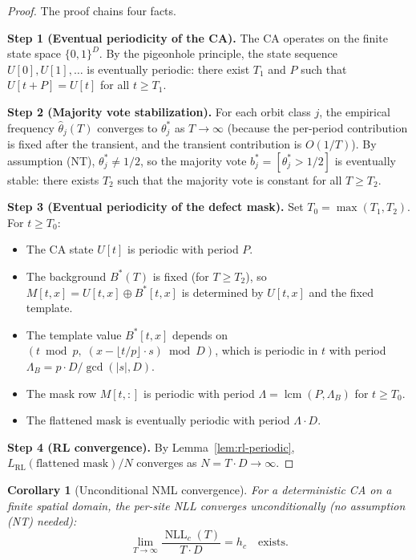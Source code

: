 \documentclass[11pt]{article}
\newtheorem{corollary}[theorem]{Corollary}
\theoremstyle{definition}
\theoremstyle{remark}
\newcommand{\NLL}{\operatorname{NLL}}
\newcommand{\RL}{\operatorname{RL}}
\begin{document}
\begin{proof}
The proof chains four facts.

\medskip\noindent
\textbf{Step 1 (Eventual periodicity of the CA).}
The CA operates on the finite state space $\{0,1\}^D$.
By the pigeonhole principle, the state sequence $U[0], U[1], \ldots$ is eventually periodic: there exist $T_1$ and $P$ such that $U[t + P] = U[t]$ for all $t \geq T_1$.

\medskip\noindent
\textbf{Step 2 (Majority vote stabilization).}
For each orbit class $j$, the empirical frequency $\hat\theta_j(T)$ converges to $\theta_j^*$ as $T \to \infty$ (because the per-period contribution is fixed after the transient, and the transient contribution is $O(1/T)$).
By assumption (NT), $\theta_j^* \neq 1/2$, so the majority vote $b_j^* = [\theta_j^* > 1/2]$ is eventually stable: there exists $T_2$ such that the majority vote is constant for all $T \geq T_2$.

\medskip\noindent
\textbf{Step 3 (Eventual periodicity of the defect mask).}
Set $T_0 = \max(T_1, T_2)$.
For $t \geq T_0$:
\begin{itemize}
    \item The CA state $U[t]$ is periodic with period $P$.
    \item The background $B^*(T)$ is fixed (for $T \geq T_2$), so $M[t, x] = U[t, x] \oplus B^*[t, x]$ is determined by $U[t, x]$ and the fixed template.
    \item The template value $B^*[t, x]$ depends on $(t \bmod p,\; (x - \lfloor t/p \rfloor \cdot s) \bmod D)$, which is periodic in $t$ with period $\Lambda_B = p \cdot D / \gcd(|s|, D)$.
    \item The mask row $M[t, :]$ is periodic with period $\Lambda = \operatorname{lcm}(P, \Lambda_B)$ for $t \geq T_0$.
    \item The flattened mask is eventually periodic with period $\Lambda \cdot D$.
\end{itemize}

\medskip\noindent
\textbf{Step 4 (RL convergence).}
By Lemma~\ref{lem:rl-periodic}, $L_{\RL}(\text{flattened mask}) / N$ converges as $N = T \cdot D \to \infty$.
\end{proof}

\begin{corollary}[Unconditional NML convergence]\label{cor:nml-unconditional}
For a deterministic CA on a finite spatial domain, the per-site NLL converges \emph{unconditionally} (no assumption \textup{(NT)} needed):
\[
\lim_{T \to \infty} \frac{\NLL_c(T)}{T \cdot D} = h_c \quad \text{exists}.
\]
\end{corollary}
\end{document}
